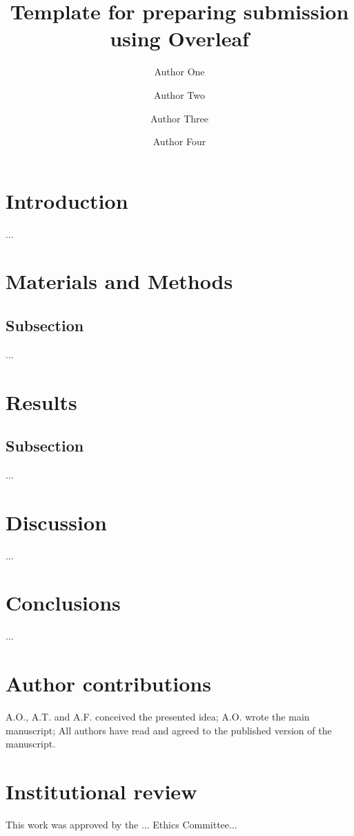 \documentclass[fleqn,10pt,lineno]{manuscript}
\title{Template for preparing submission using Overleaf}
\author[1]{Author One}
\author[1]{Author Two}
\author[2,3]{Author Three}
\author[1]{Author Four}
\affil[1]{Author one affiliation}
\affil[2]{Author two affiliation}
\affil[3]{Author three affiliation}
\begin{document}
\flushbottom
\maketitle
\thispagestyle{empty}


\section*{Introduction}
...

\section*{Materials and Methods}

\subsection*{Subsection}
...

\section*{Results}

\subsection*{Subsection}
...
 
\section*{Discussion}
...

\section*{Conclusions}
...

\section*{Author contributions}
A.O., A.T. and A.F. conceived the presented idea; A.O. wrote the main manuscript; All authors have read and agreed to the published version of the manuscript.

\section*{Institutional review}
This work was approved by the ... Ethics Committee...
\end{document}
